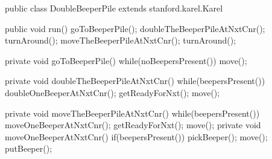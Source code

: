 \begin{sloppypar}
\begin{figure}[tbh!]
  \caption{}
  \begin{subfigure}[t]{0.48\textwidth}
      \caption{}
      \label{fig:getReadyForNxtPre1}
  \end{subfigure}
  \hspace{0.1in}
  \begin{subfigure}[t]{0.48\textwidth}
      \caption{}
      \label{fig:getReadyForNxtPost1}
  \end{subfigure}
  \begin{subfigure}[t]{0.48\textwidth}
    \caption{}
    \label{fig:getReadyForNxtPre2}
  \end{subfigure}
  \hspace{0.1in}
  \begin{subfigure}[t]{0.48\textwidth}
      \caption{}
      \label{fig:getReadyForNxtPost2}
  \end{subfigure}
  \label{fig:getReadyForNxtPreAndPost}
\end{figure}

\begin{lstcodelong}[caption=ပထမစမ်းကြည့်ပုံ, label={lst:DoubleBeeperPileFull}] 
public class DoubleBeeperPile extends stanford.karel.Karel {
        public void run() {
                goToBeeperPile();
                doubleTheBeeperPileAtNxtCnr();
                turnAround();
                moveTheBeeperPileAtNxtCnr();
                turnAround();
        }

        private void goToBeeperPile() {
                while(noBeepersPresent()) {
                        move();
                }
        }

        private void doubleTheBeeperPileAtNxtCnr() {
                while(beepersPresent()) {
                        doubleOneBeeperAtNxtCnr();
                        getReadyForNxt();
                }
                move();
        }

        private void moveTheBeeperPileAtNxtCnr() {
                while(beepersPresent()) {
                        moveOneBeeperAtNxtCnr();
                        getReadyForNxt();
                }
                move();
        }
        private void moveOneBeeperAtNxtCnr() {
                if(beepersPresent()) {
                        pickBeeper();
                }
                move();
                putBeeper();
        }
        
}
\end{lstcodelong}
\end{sloppypar}
